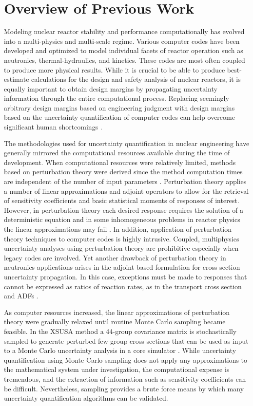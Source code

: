 \section{Overview of Previous Work} 
\label{sec:literature_review}

Modeling nuclear reactor stability and performance computationally has evolved into a multi-physics and multi-scale regime. Various computer codes have been developed and optimized to model individual facets of reactor operation such as neutronics, thermal-hydraulics, and kinetics. These codes are most often coupled to produce more physical results. While it is crucial to be able to produce best-estimate calculations for the design and safety analysis of nuclear reactors, it is equally important to obtain design margins by propagating uncertainty information through the entire computational process. Replacing seemingly arbitrary design margins based on engineering judgment with design margins based on the uncertainty quantification of computer codes can help overcome significant human shortcomings \cite{Eardley}.   

The methodologies used for uncertainty quantification in nuclear engineering have generally mirrored the computational resources available during the time of development. When computational resources were relatively limited, methods based on perturbation theory were derived since the method computation times are independent of the number of input parameters \cite{MLWilliams}. Perturbation theory applies a number of linear approximations and adjoint operators to allow for the retrieval of sensitivity coefficients and basic statistical moments of responses of interest. However, in perturbation theory each desired response requires the solution of a deterministic equation and in some inhomogeneous problems in reactor physics the linear approximations may fail \cite{Gandini}. In addition, application of perturbation theory techniques to computer codes is highly intrusive. Coupled, multiphysics uncertainty analyses using perturbation theory are prohibitive especially when legacy codes are involved. Yet another drawback of perturbation theory in neutronics applications arises in the adjoint-based formulation for cross section uncertainty propagation. In this case, exceptions must be made to responses that cannot be expressed as ratios of reaction rates, as in the transport cross section and \ac{ADFs} \cite{TwoStep_Approach} \cite{Yankov1}. 

As computer resources increased, the linear approximations of perturbation theory were gradually relaxed until routine Monte Carlo sampling became feasible. In the XSUSA method a 44-group covariance matrix is stochastically sampled to generate perturbed few-group cross sections that can be used as input to a Monte Carlo uncertainty analysis in a core simulator \cite{Klein_Gallner}. While uncertainty quantification using Monte Carlo sampling does not apply any approximations to the mathematical system under investigation, the computational expense is tremendous, and the extraction of information such as sensitivity coefficients can be difficult. Nevertheless, sampling provides a brute force means by which many uncertainty quantification algorithms can be validated. 

